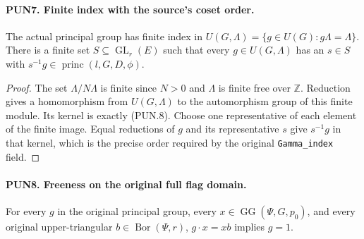 \documentclass[11pt,a4paper]{article}
\numberwithin{equation}{section}
\theoremstyle{remark}\newtheorem{remark}[theorem]{Remark}
\begin{document}
\paragraph{PUN7. Finite index with the source's coset order.}
\label{claim:PUN7}
The actual principal group has finite index in
\(U(G,\Lambda)=\{g\in U(G):g\Lambda=\Lambda\}\).
There is a finite set \(S\subseteq\operatorname{GL}_r(E)\)
such that every \(g\in U(G,\Lambda)\) has an \(s\in S\) with
\(s^{-1}g\in\operatorname{princ}(l,G,D,\phi)\).

\begin{proof}
The set \(\Lambda/N\Lambda\) is finite since \(N>0\) and
\(\Lambda\) is finite free over \(\mathbb Z\).  Reduction gives
a homomorphism from \(U(G,\Lambda)\) to the automorphism group
of this finite module.  Its kernel is exactly (PUN.8).  Choose
one representative of each element of the finite image.  Equal
reductions of \(g\) and its representative \(s\) give
\(s^{-1}g\) in that kernel, which is the precise order required
by the original \texttt{Gamma\_\allowbreak index} field.
\end{proof}

\paragraph{PUN8. Freeness on the original full flag domain.}
\label{claim:PUN8}
For every \(g\) in the original principal group, every
\(x\in\operatorname{GG}(\Psi,G,p_0)\), and every original
upper-triangular \(b\in\operatorname{Bor}(\Psi,r)\),
\(g\cdot x=x b\) implies \(g=1\).
\end{document}
